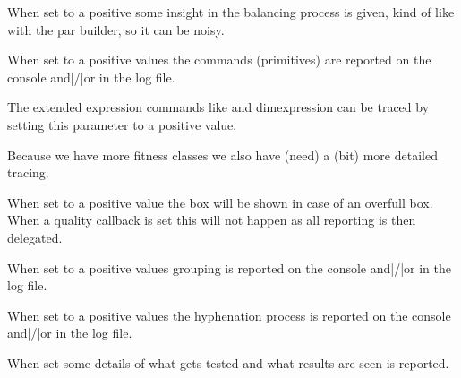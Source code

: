 \stopoldprimitive

\startnewprimitive[title={\prm {tracingbalancing}}]

When set to a positive some insight in the balancing process is given, kind of
like with the par builder, so it can be noisy.

\stopnewprimitive

\startoldprimitive[title={\prm {tracingcommands}}]

When set to a positive values the commands (primitives) are reported on the console
and|/|or in the log file.

\stopoldprimitive

\startnewprimitive[title={\prm {tracingexpressions}}]

The extended expression commands like  and \prm
{dimexpression} can be traced by setting this parameter to a positive value.

\stopnewprimitive

\startnewprimitive[title={\prm {tracingfitness}}]

Because we have more fitness classes we also have (need) a (bit) more detailed
tracing.

\stopnewprimitive

\startnewprimitive[title={\prm {tracingfullboxes}}]

When set to a positive value the box will be shown in case of an overfull box.
When a quality callback is set this will not happen as all reporting is then
delegated.

\stopnewprimitive

\startoldprimitive[title={\prm {tracinggroups}}]

When set to a positive values grouping is reported on the console and|/|or in the
log file.

\stopoldprimitive

\startnewprimitive[title={\prm {tracinghyphenation}}]

When set to a positive values the hyphenation process is reported on the console
and|/|or in the log file.

\stopnewprimitive

\startoldprimitive[title={\prm {tracingifs}}]

When set some details of what gets tested and what results are seen is reported.

\stopoldprimitive

\startnewprimitive[title={\prm {tracinginserts}}]

